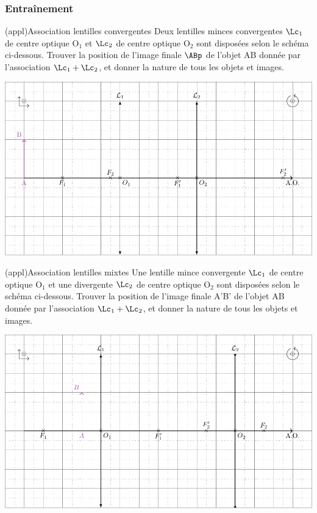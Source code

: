 \documentclass[../../main/main.tex]{subfiles}
\begin{document}
\subsubsection{Entraînement}

\begin{tcb*}[label=exem:asso_lent](appl){Association lentilles convergentes}
	Deux lentilles minces convergentes $\Lc_1$ de centre optique O$_1$ et
	$\Lc_2$ de centre optique O$_2$ sont disposées selon le schéma ci-dessous.
	Trouver la position de l'image finale $\ABp$ de l'objet AB donnée par
	l'association $\Lc_1 + \Lc_2$, et donner la nature de tous les objets et
	images.
	\tcblower
	\begin{center}
		\includegraphics[width=.85\linewidth]{asso_lent-a_plain.pdf}
		\label{fig:asso_lent-conv_plain}
	\end{center}
\end{tcb*}
\begin{tcb*}[label=exem:asso_lent](appl){Association lentilles mixtes}
	Une lentille mince convergente $\Lc_1$ de centre optique O$_1$ et une
	divergente $\Lc_2$ de centre optique O$_2$ sont disposées selon le schéma
	ci-dessous. Trouver la position de l'image finale A'B' de l'objet AB
	donnée par l'association $\Lc_1 + \Lc_2$, et donner la nature de tous les
	objets et images.
	\tcblower
	\begin{center}
		\includegraphics[width=.85\linewidth]{asso_lent-b_plain.pdf}
		\label{fig:asso_lent-mix_plain}
	\end{center}
\end{tcb*}
\end{document}
